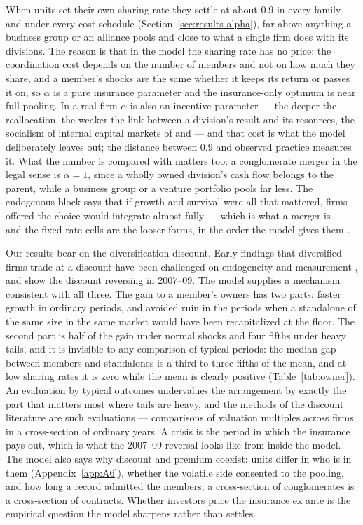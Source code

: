When units set their own sharing rate they settle at about 0.9 in every family and under every cost schedule (Section~\ref{sec:results-alpha}), far above anything a business group or an alliance pools and close to what a single firm does with its divisions. The reason is that in the model the sharing rate has no price: the coordination cost depends on the number of members and not on how much they share, and a member's shocks are the same whether it keeps its return or passes it on, so $\alpha$ is a pure insurance parameter and the insurance-only optimum is near full pooling. In a real firm $\alpha$ is also an incentive parameter --- the deeper the reallocation, the weaker the link between a division's result and its resources, the socialism of internal capital markets of \textcite{scharfstein2000dark} and \textcite{rajan2000cost} --- and that cost is what the model deliberately leaves out; the distance between 0.9 and observed practice measures it. What the number is compared with matters too: a conglomerate merger in the legal sense is $\alpha = 1$, since a wholly owned division's cash flow belongs to the parent, while a business group or a venture portfolio pools far less. The endogenous block says that if growth and survival were all that mattered, firms offered the choice would integrate almost fully --- which is what a merger is --- and the fixed-rate cells are the looser forms, in the order the model gives them \parencite{boyd2023ergodic}.

Our results bear on the diversification discount. Early findings that diversified firms trade at a discount \parencite{lang1994tobins, berger1995diversification} have been challenged on endogeneity \parencite{campa2002explaining} and measurement \parencite{villalonga2004diversification}, and \textcite{kuppuswamy2016does} show the discount reversing in 2007--09. The model supplies a mechanism consistent with all three. The gain to a member's owners has two parts: faster growth in ordinary periods, and avoided ruin in the periods when a standalone of the same size in the same market would have been recapitalized at the floor. The second part is half of the gain under normal shocks and four fifths under heavy tails, and it is invisible to any comparison of typical periods: the median gap between members and standalones is a third to three fifths of the mean, and at low sharing rates it is zero while the mean is clearly positive (Table~\ref{tab:owner}). An evaluation by typical outcomes undervalues the arrangement by exactly the part that matters most where tails are heavy, and the methods of the discount literature are such evaluations --- comparisons of valuation multiples across firms in a cross-section of ordinary years. A crisis is the period in which the insurance pays out, which is what the 2007--09 reversal looks like from inside the model. The model also says why discount and premium coexist: units differ in who is in them (Appendix~\ref{app:A6}), whether the volatile side consented to the pooling, and how long a record admitted the members; a cross-section of conglomerates is a cross-section of contracts. Whether investors price the insurance ex ante is the empirical question the model sharpens rather than settles.

